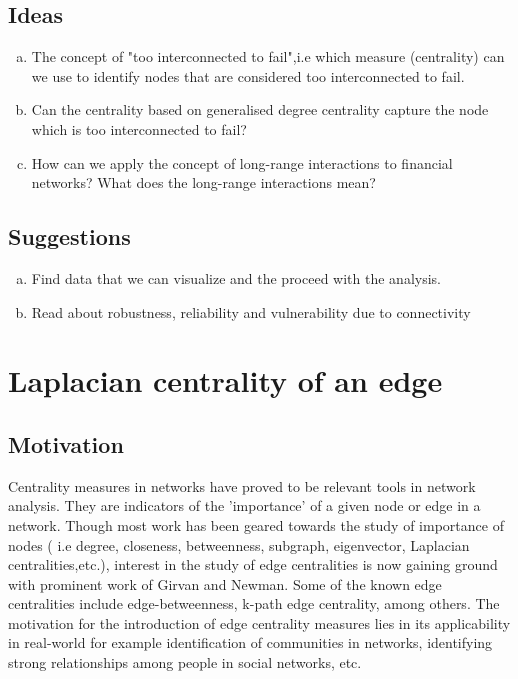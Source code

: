 \documentclass[10pt,a4paper]{article}
\begin{document}
    \subsection{Ideas}
    \begin{enumerate}[a)]
    	\item The concept of "too interconnected to fail",i.e which measure (centrality) can we use to identify nodes that are considered too interconnected to fail.
    	\item Can the centrality based on generalised degree centrality capture the node which is too interconnected to fail?
    	\item How can we apply the concept of long-range interactions to financial networks? What does the long-range interactions mean?
    \end{enumerate}
    \subsection{Suggestions}
    
    \begin{enumerate}[a)]
    	\item Find data that we can visualize and the proceed with the analysis.
    	\item  Read about robustness, reliability and vulnerability due to connectivity
    \end{enumerate}

	\section{Laplacian centrality of an edge}
	\subsection{Motivation}
	Centrality measures in networks have proved to be relevant tools in network analysis. They are indicators of the 'importance' of a given node or edge in a network. Though most work has been geared towards the study of importance of nodes ( i.e degree, closeness, betweenness, subgraph, eigenvector, Laplacian centralities,etc.), interest in the study of edge centralities is now gaining ground with prominent work of  Girvan and Newman. Some of the known edge centralities include edge-betweenness, k-path edge centrality, among others. The motivation for the introduction of edge centrality measures lies in its applicability in real-world for example identification of communities in networks, identifying strong relationships among people in social networks, etc. 
\end{document}
